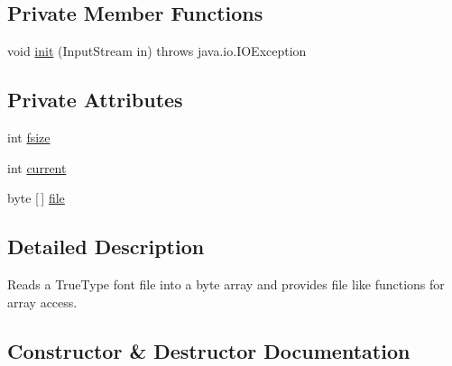 \subsection*{Private Member Functions}
\begin{DoxyCompactItemize}
\item 
void \mbox{\hyperlink{classorg_1_1newdawn_1_1slick_1_1tools_1_1hiero_1_1truetype_1_1_font_file_reader_ae548c9d2f8c005c44be47a00c173c44b}{init}} (Input\+Stream in)  throws java.\+io.\+I\+O\+Exception 
\end{DoxyCompactItemize}
\subsection*{Private Attributes}
\begin{DoxyCompactItemize}
\item 
int \mbox{\hyperlink{classorg_1_1newdawn_1_1slick_1_1tools_1_1hiero_1_1truetype_1_1_font_file_reader_a247fb2663cf669a7842919c405f41bfe}{fsize}}
\item 
int \mbox{\hyperlink{classorg_1_1newdawn_1_1slick_1_1tools_1_1hiero_1_1truetype_1_1_font_file_reader_ab082d04b7f0a287496055b8e5f203cb4}{current}}
\item 
byte \mbox{[}$\,$\mbox{]} \mbox{\hyperlink{classorg_1_1newdawn_1_1slick_1_1tools_1_1hiero_1_1truetype_1_1_font_file_reader_ab4c57b8a3e3eba60293c11bf50d7cc42}{file}}
\end{DoxyCompactItemize}


\subsection{Detailed Description}
Reads a True\+Type font file into a byte array and provides file like functions for array access. 

\subsection{Constructor \& Destructor Documentation}
\mbox{\label{classorg_1_1newdawn_1_1slick_1_1tools_1_1hiero_1_1truetype_1_1_font_file_reader_a2b4b6e5f92828e9c88b8dd53c3566b80}} 
